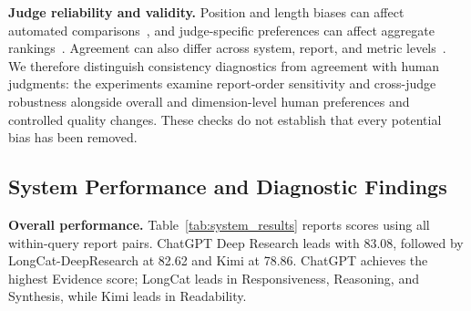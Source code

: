 \documentclass{article}
\begin{document}
\textbf{Judge reliability and validity.}
Position and length biases can affect automated comparisons~\citep{faireval2023,lcalpacaeval2024}, and judge-specific preferences can affect aggregate rankings~\citep{justrank2024}. Agreement can also differ across system, report, and metric levels~\citep{shalloweval2026}. We therefore distinguish consistency diagnostics from agreement with human judgments: the experiments examine report-order sensitivity and cross-judge robustness alongside overall and dimension-level human preferences and controlled quality changes. These checks do not establish that every potential bias has been removed.

\subsection{System Performance and Diagnostic Findings}
\label{sec:system_results}
\textbf{Overall performance.}
Table~\ref{tab:system_results} reports scores using all within-query report pairs. ChatGPT Deep Research leads with 83.08, followed by LongCat-DeepResearch at 82.62 and Kimi at 78.86. ChatGPT achieves the highest Evidence score; LongCat leads in Responsiveness, Reasoning, and Synthesis, while Kimi leads in Readability.
\end{document}
